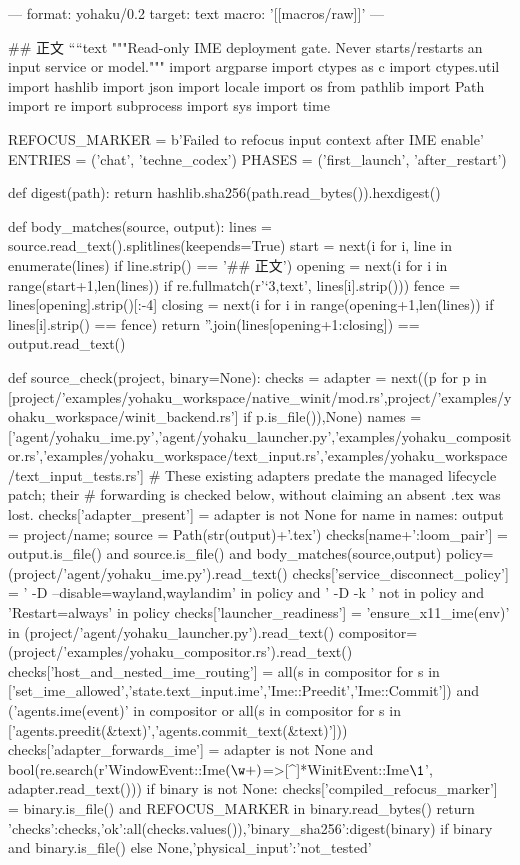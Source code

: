 ---
format: yohaku/0.2
target: text
macro: '[[macros/raw]]'
---

## 正文
````text
"""Read-only IME deployment gate. Never starts/restarts an input service or model."""
import argparse
import ctypes as c
import ctypes.util
import hashlib
import json
import locale
import os
from pathlib import Path
import re
import subprocess
import sys
import time

REFOCUS_MARKER = b'Failed to refocus input context after IME enable'
ENTRIES = ('chat', 'techne_codex')
PHASES = ('first_launch', 'after_restart')

def digest(path):
    return hashlib.sha256(path.read_bytes()).hexdigest()

def body_matches(source, output):
    lines = source.read_text().splitlines(keepends=True)
    start = next(i for i, line in enumerate(lines) if line.strip() == '## 正文')
    opening = next(i for i in range(start+1,len(lines)) if re.fullmatch(r'`{3,}text\s*', lines[i].strip()))
    fence = lines[opening].strip()[:-4]
    closing = next(i for i in range(opening+1,len(lines)) if lines[i].strip() == fence)
    return ''.join(lines[opening+1:closing]) == output.read_text()

def source_check(project, binary=None):
    checks = {}
    adapter = next((p for p in [project/'examples/yohaku_workspace/native_winit/mod.rs',project/'examples/yohaku_workspace/winit_backend.rs'] if p.is_file()),None)
    names = ['agent/yohaku_ime.py','agent/yohaku_launcher.py','examples/yohaku_compositor.rs','examples/yohaku_workspace/text_input.rs','examples/yohaku_workspace/text_input_tests.rs']
    # These existing adapters predate the managed lifecycle patch; their
    # forwarding is checked below, without claiming an absent .tex was lost.
    checks['adapter_present'] = adapter is not None
    for name in names:
        output = project/name; source = Path(str(output)+'.tex')
        checks[name+':loom_pair'] = output.is_file() and source.is_file() and body_matches(source,output)
    policy=(project/'agent/yohaku_ime.py').read_text()
    checks['service_disconnect_policy'] = ' -D --disable=wayland,waylandim' in policy and ' -D -k ' not in policy and 'Restart=always' in policy
    checks['launcher_readiness'] = 'ensure_x11_ime(env)' in (project/'agent/yohaku_launcher.py').read_text()
    compositor=(project/'examples/yohaku_compositor.rs').read_text()
    checks['host_and_nested_ime_routing'] = all(s in compositor for s in ['set_ime_allowed','state.text_input.ime','Ime::Preedit','Ime::Commit']) and ('agents.ime(event)' in compositor or all(s in compositor for s in ['agents.preedit(&text)','agents.commit_text(&text)']))
    checks['adapter_forwards_ime'] = adapter is not None and bool(re.search(r'WindowEvent::Ime\((\w+)\)\s*=>[^\n]*WinitEvent::Ime\(\1\)', adapter.read_text()))
    if binary is not None:
        checks['compiled_refocus_marker'] = binary.is_file() and REFOCUS_MARKER in binary.read_bytes()
    return {'checks':checks,'ok':all(checks.values()),'binary_sha256':digest(binary) if binary and binary.is_file() else None,'physical_input':'not_tested'}

